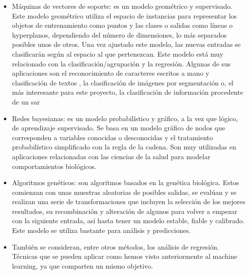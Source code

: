 \begin{itemize}
	\item Máquinas de vectores de soporte: es un modelo geométrico y supervisado. Este modelo geométrico utiliza el espacio de instancias para representar los objetos de entrenamiento como puntos y las clases o salidas como líneas o hyperplanos, dependiendo del número de dimensiones, lo más separados posibles unos de otros. Una vez ajustado este modelo, las nuevas entradas se clasificarán según al espacio al que pertenezcan. Este modelo está muy relacionado con la clasificación/agrupación y la regresión. Algunas de sus aplicaciones son el reconocimiento de caracteres escritos a mano \cite{MLhand} y clasificación de textos \citep{MLText}, la clasificación de imágenes por segmentación \citep{MLimg} o, el más interesante para este proyecto, la clasificación de información procedente de un \gls{sar} \citep{MLSAR}
	\item Redes bayesianas: es un modelo probabilístico y gráfico, a la vez que lógico, de aprendizaje supervisado. Se basa en un modelo gráfico de nodos que corresponden a variables conocidas o desconocidas y el tratamiento probabilístico simplificado con la regla de la cadena. Son muy utilizadas en aplicaciones relacionadas con las ciencias de la salud para modelar comportamientos biológicos. 
	\item Algoritmos genéticos: son algoritmos basados en la genética biológica. Estos comienzan con unas muestras aleatorias de posibles salidas, se evalúan y se realizan una serie de transformaciones que incluyen la selección de los mejores resultados, su recombinación y alteración de algunos para volver a empezar con la siguiente entrada, así hasta tener un modelo estable, fiable y calibrado. Este modelo se utiliza bastante para análisis y predicciones.
	\item También se consideran, entre otros métodos, los análisis de regresión. Técnicas que se pueden aplicar como hemos visto anteriormente al machine learning, ya que comparten un mismo objetivo. 
\end{itemize}

